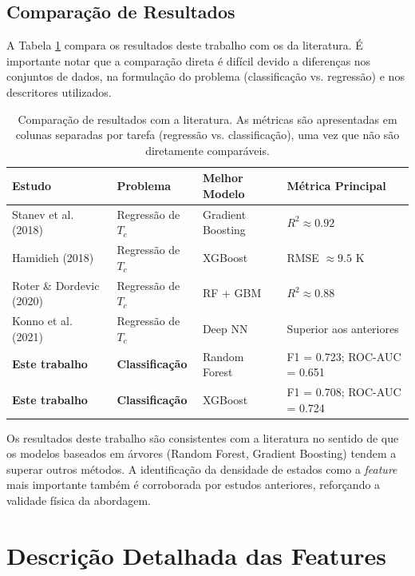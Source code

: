 \documentclass[12pt, a4paper, oneside]{report}
\begin{document}
\section{Comparação de Resultados}

A Tabela \ref{tab:comparacao_literatura} compara os resultados deste trabalho com os da literatura. É importante notar que a comparação direta é difícil devido a diferenças nos conjuntos de dados, na formulação do problema (classificação vs. regressão) e nos descritores utilizados.

\begin{table}[H]
    \centering
    \caption{Comparação de resultados com a literatura. As métricas são apresentadas em colunas separadas por tarefa (regressão vs. classificação), uma vez que não são diretamente comparáveis.}
    \label{tab:comparacao_literatura}
    \begin{tabular}{llll}
        \toprule
        \textbf{Estudo} & \textbf{Problema} & \textbf{Melhor Modelo} & \textbf{Métrica Principal} \\
        \midrule
        Stanev et al. (2018) \cite{stanev2018} & Regressão de $T_c$ & Gradient Boosting & $R^2 \approx 0.92$ \\
        Hamidieh (2018) \cite{hamidieh2018} & Regressão de $T_c$ & XGBoost & RMSE $\approx 9.5$ K \\
        Roter \& Dordevic (2020) \cite{roter2020} & Regressão de $T_c$ & RF + GBM & $R^2 \approx 0.88$ \\
        Konno et al. (2021) \cite{konno2021} & Regressão de $T_c$ & Deep NN & Superior aos anteriores \\
        \textbf{Este trabalho} & \textbf{Classificação} & Random Forest & F1 = 0.723; ROC-AUC = 0.651 \\
        \textbf{Este trabalho} & \textbf{Classificação} & XGBoost & F1 = 0.708; ROC-AUC = 0.724 \\
        \bottomrule
    \end{tabular}
\end{table}

Os resultados deste trabalho são consistentes com a literatura no sentido de que os modelos baseados em árvores (Random Forest, Gradient Boosting) tendem a superar outros métodos. A identificação da densidade de estados como a \textit{feature} mais importante também é corroborada por estudos anteriores, reforçando a validade física da abordagem.

\chapter{Descrição Detalhada das Features}
\label{app:features}
\end{document}

